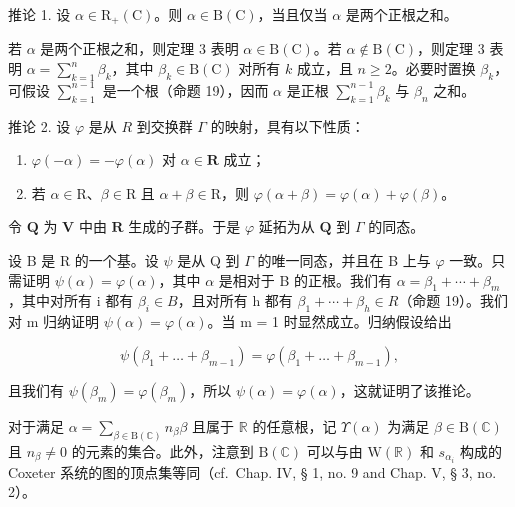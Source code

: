 推论 1. 设 \(\alpha \in \mathrm{R}_{+}(\mathrm{C})\)。则 \(\alpha \in \mathrm{B}(\mathrm{C})\)，当且仅当 \(\alpha\) 是两个正根之和。

若 \(\alpha\) 是两个正根之和，则定理 3 表明 \(\alpha \in \mathrm{B}(\mathrm{C})\)。若 \(\alpha \notin \mathrm{B}(\mathrm{C})\)，则定理 3 表明 \(\alpha = \sum_{k=1}^{n} \beta_k\)，其中 \(\beta_k \in \mathrm{B}(\mathrm{C})\) 对所有 \(k\) 成立，且 \(n \geqslant 2\)。必要时置换 \(\beta_k\)，可假设 \(\sum_{k=1}^{n-1}\) 是一个根（命题 19），因而 \(\alpha\) 是正根 \(\sum_{k=1}^{n-1} \beta_k\) 与 \(\beta_n\) 之和。

推论 2. 设 \(\varphi\) 是从 \(R\) 到交换群 \(\Gamma\) 的映射，具有以下性质：

\begin{enumerate}
\def\labelenumi{\arabic{enumi})}
\item
  \(\varphi(-\alpha) = -\varphi(\alpha)\) 对 \(\alpha \in \mathbf{R}\) 成立；
\item
  若 \(\alpha \in \mathrm{R}\)、\(\beta \in \mathrm{R}\) 且 \(\alpha + \beta \in \mathrm{R}\)，则 \(\varphi(\alpha + \beta) = \varphi(\alpha) + \varphi(\beta)\)。
\end{enumerate}

令 \(\mathbf{Q}\) 为 \(\mathbf{V}\) 中由 \(\mathbf{R}\) 生成的子群。于是 \(\varphi\) 延拓为从 \(\mathbf{Q}\) 到 \(\Gamma\) 的同态。

设 B 是 R 的一个基。设 \(\psi\) 是从 Q 到 \(\Gamma\) 的唯一同态，并且在 B 上与 \(\varphi\) 一致。只需证明 \(\psi(\alpha) = \varphi(\alpha)\)，其中 \(\alpha\) 是相对于 B 的正根。我们有 \(\alpha = \beta_{1} + \cdots + \beta_{m}\)，其中对所有 i 都有 \(\beta_{i} \in B\)，且对所有 h 都有 \(\beta_{1} + \cdots + \beta_{h} \in R\)（命题 19）。我们对 m 归纳证明 \(\psi(\alpha) = \varphi(\alpha)\)。当 m = 1 时显然成立。归纳假设给出

\[
\psi \left(\beta_ {1} + \dots + \beta_ {m - 1}\right) = \varphi \left(\beta_ {1} + \dots + \beta_ {m - 1}\right),
\]

且我们有 \(\psi (\beta_m) = \varphi (\beta_m)\)，所以 \(\psi (\alpha) = \varphi (\alpha)\)，这就证明了该推论。

 对于满足 \(\alpha = \sum_{\beta \in \mathrm{B}(\mathbb{C})} n_{\beta} \beta\) 且属于 \(\mathbb{R}\) 的任意根，记 \(\Upsilon(\alpha)\) 为满足 \(\beta \in \mathrm{B}(\mathbb{C})\) 且 \(n_{\beta} \neq 0\) 的元素的集合。此外，注意到 \(\mathrm{B}(\mathbb{C})\) 可以与由 \(\mathrm{W}(\mathbb{R})\) 和 \(s_{\alpha_i}\) 构成的 Coxeter 系统的图的顶点集等同（cf.~Chap. IV, § 1, no. 9 and Chap. V, § 3, no. 2）。

